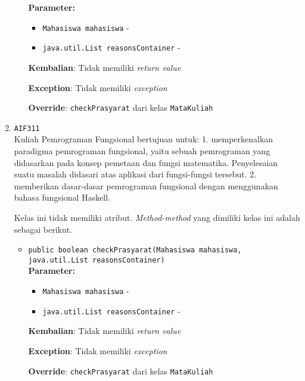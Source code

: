 \documentclass{article}
\begin{document}
\begin{enumerate}
\begin{itemize}
\textbf{Parameter:}\begin{itemize}
\item \texttt{Mahasiswa mahasiswa} - 
\item \texttt{java.util.List reasonsContainer} - 
\end{itemize}
\textbf{Kembalian}: Tidak memiliki \textit{return value}

\textbf{Exception}: Tidak memiliki \textit{exception}

\textbf{Override}: \texttt{checkPrasyarat} dari kelas \texttt{MataKuliah}

\end{itemize}
\item \texttt{AIF311}\\ 
Kuliah Pemrograman Fungsional bertujuan untuk: 1. memperkenalkan paradigma
 pemrograman fungsional, yaitu sebuah pemrograman yang didasarkan pada konsep
 pemetaan dan fungsi matematika. Penyelesaian suatu masalah didasari atas
 aplikasi dari fungsi-fungsi tersebut. 2. memberikan dasar-dasar pemrograman
 fungsional dengan menggunakan bahasa fungsional Haskell.

Kelas ini tidak memiliki atribut. \textit{Method-method} yang dimiliki kelas ini adalah sebagai berikut.
\begin{itemize}
\item \texttt{public boolean checkPrasyarat(Mahasiswa mahasiswa, java.util.List reasonsContainer)}\\ 


\textbf{Parameter:}\begin{itemize}
\item \texttt{Mahasiswa mahasiswa} - 
\item \texttt{java.util.List reasonsContainer} - 
\end{itemize}
\textbf{Kembalian}: Tidak memiliki \textit{return value}

\textbf{Exception}: Tidak memiliki \textit{exception}

\textbf{Override}: \texttt{checkPrasyarat} dari kelas \texttt{MataKuliah}


\end{itemize}
\end{enumerate}
\end{document}
